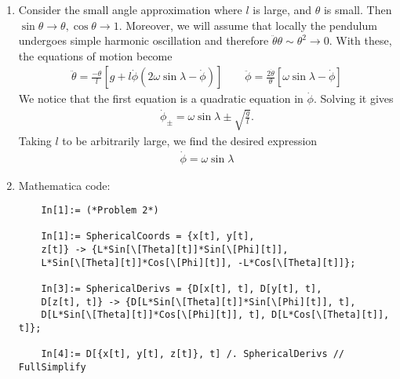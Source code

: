 \documentclass{article}
\theoremstyle{definition}
\newcommand{\p}{\partial}
\newcommand{\lag}{\mathcal{L}}
\newcommand{\f}[2]{\frac{#1}{#2}}
\newcommand{\lp}{\left(}
\newcommand{\rp}{\right)}
\newcommand{\lb}{\left[}
\newcommand{\rb}{\right]}
\begin{document}
\begin{enumerate}[label=(\alph*)]
\begin{align*}
	\cos 2 \theta \sin \phi +\dot\theta^2+\dot\phi \left(\sin^2\theta\left(\dot\phi-2 \omega  \sin \lambda \right)-\omega  \cos \lambda  \sin 2\theta  \cos \phi\right)\right)\right).
	\end{align*}
	The equations of motion are:
	\begin{align*}
	&\f{d}{dt} \f{\p \lag}{\p \dot{\theta}} = \f{\p \lag}{\p \theta} \implies 
	\boxed{\ddot\theta = \f{-\sin\theta }{l}\lb g+ l\cos\theta(2\omega\sin\lambda - \dot\phi)\dot\phi  \rb}\\
	&\f{d}{dt} \f{\p \lag}{\p \dot\phi} = \f{\p \lag}{\p \phi} \implies \boxed{\ddot\phi = 2\cot\theta \dot\theta \lp \omega\sin\lambda - \dot\phi \rp }
	\end{align*}
	
	
	\item Consider the small angle approximation where $l$ is large, and $\theta$ is small. Then $\sin\theta \to \theta, \cos\theta \to 1$. Moreover, we will assume that locally the pendulum undergoes simple harmonic oscillation and therefore $\ddot\theta \theta \sim \theta^2 \to 0$. With these, the equations of motion become
	\begin{align*}
	\boxed{\ddot\theta = \f{-\theta  }{l}\lb g+ l\dot\phi (2\omega\sin\lambda - \dot\phi) \rb} 
	\quad \quad 
	\boxed{\ddot\phi = \f{2\dot\theta }{\theta} \lb \omega\sin\lambda - \dot\phi \rb }
	\end{align*}
	We notice that the first equation is a quadratic equation in $\dot\phi$. Solving it gives
	\begin{align*}
	\dot\phi_\pm = \omega \sin\lambda \pm \sqrt{\f{g}{l}}.
	\end{align*}
	Taking $l$ to be arbitrarily large, we find the desired expression
	\begin{align*}
	\boxed{\dot\phi = \omega\sin\lambda}
	\end{align*}
	
	
	\item Mathematica code:
	\begin{lstlisting}
	In[1]:= (*Problem 2*)
	
	In[1]:= SphericalCoords = {x[t], y[t], 
	z[t]} -> {L*Sin[\[Theta][t]]*Sin[\[Phi][t]], 
	L*Sin[\[Theta][t]]*Cos[\[Phi][t]], -L*Cos[\[Theta][t]]};
	
	In[3]:= SphericalDerivs = {D[x[t], t], D[y[t], t], 
	D[z[t], t]} -> {D[L*Sin[\[Theta][t]]*Sin[\[Phi][t]], t], 
	D[L*Sin[\[Theta][t]]*Cos[\[Phi][t]], t], D[L*Cos[\[Theta][t]], t]};
	
	In[4]:= D[{x[t], y[t], z[t]}, t] /. SphericalDerivs // FullSimplify
	

\end{lstlisting}
\end{enumerate}
\end{document}
